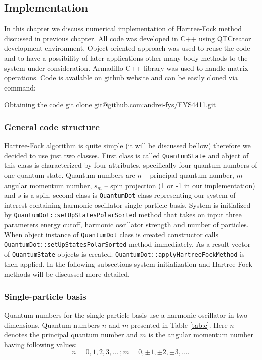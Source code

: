 \documentclass[10pt]{article}
\newcommand{\code}[1]{\colorbox{coding}{\texttt{#1}}}
\begin{document}
\subsection{Implementation}

In this chapter we discuss numerical implementation of Hartree-Fock method discussed in previous chapter.
All code was developed in C++ using QTCreator development environment. Object-oriented approach was used to reuse the code and to have a possibility of later applications other many-body methods to the system under consideration. Armadillo C++ library was used to handle matrix operations.
Code is available on github website and can be easily cloned via command:
\begin{pseudolisting}{Obtaining the code}
git clone git@github.com:andrei-fys/FYS4411.git
\end{pseudolisting}

\subsubsection{General code structure}
Hartree-Fock algorithm is quite simple (it will be discussed bellow) therefore we decided to use just two classes. First class is called \code{QuantumState} and abject of this class is characterized by four attributes, specifically four quantum numbers of one quantum state. Quantum numbers are $n$ -- principal quantum number, $m$ -- angular momentum number, $s_m$ -- spin projection (1 or -1 in our implementation) and  $s$  is a spin. 
second class is \code{QuantumDot} class representing our system of interest containing harmonic oscillator single particle basis. System is initialized by \code{QuantumDot::setUpStatesPolarSorted} method that takes on input three parameters energy cutoff, harmonic oscillator strength and number of particles.
When object instance of \code{QuantumDot} class is created constructor calls \code{QuantumDot::setUpStatesPolarSorted} method immediately. As a result vector of \code{QuantumState} objects is created.
\code{QuantumDot::applyHartreeFockMethod} is then applied. In the following subsections system initialization and Hartree-Fock methods will be discussed more detailed.


\subsubsection{Single-particle basis}
Quantum numbers for the single-particle basis use a harmonic oscillator in two dimensions. Quantum numbers $n$ and $m$ presented in Table \ref{tab:c}.
Here $n$ denotes the principal quantum number and $m$ is the angular momentum number having following values:
\[
n = 0, 1, 2, 3, ... \ ;
m = 0, \pm 1, \pm 2, \pm 3, .... 
\]
\end{document}
